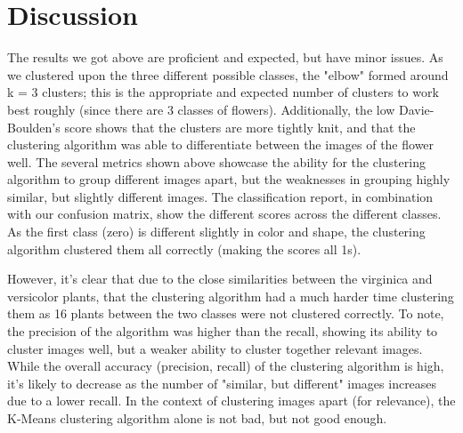 \documentclass[10pt,twocolumn]{article}
\begin{document}
\section {Discussion}



The results we got above are proficient and expected, but have minor issues. As we clustered upon the three different possible classes, the "elbow" formed around k = 3 clusters; this is the appropriate and expected number of clusters to work best roughly (since there are 3 classes of flowers). Additionally, the low Davie-Boulden's score shows that the clusters are more tightly knit, and that the clustering algorithm was able to differentiate between the images of the flower well. The several metrics shown above showcase the ability for the clustering algorithm to group different images apart, but the weaknesses in grouping highly similar, but slightly different images. The classification report, in combination with our confusion matrix, show the different scores across the different classes. As the first class (zero) is different slightly in color and shape, the clustering algorithm clustered them all correctly (making the scores all 1s). 

However, it's clear that due to the close similarities between the virginica and versicolor plants, that the clustering algorithm had a much harder time clustering them as 16 plants between the two classes were not clustered correctly. To note, the precision of the algorithm was higher than the recall, showing its ability to cluster images well, but a weaker ability to cluster together relevant images. While the overall accuracy (precision, recall) of the clustering algorithm is high, it's likely to decrease as the number of "similar, but different" images increases due to a lower recall. In the context of clustering images apart (for relevance), the K-Means clustering algorithm alone is not bad, but not good enough.

\end{document}
